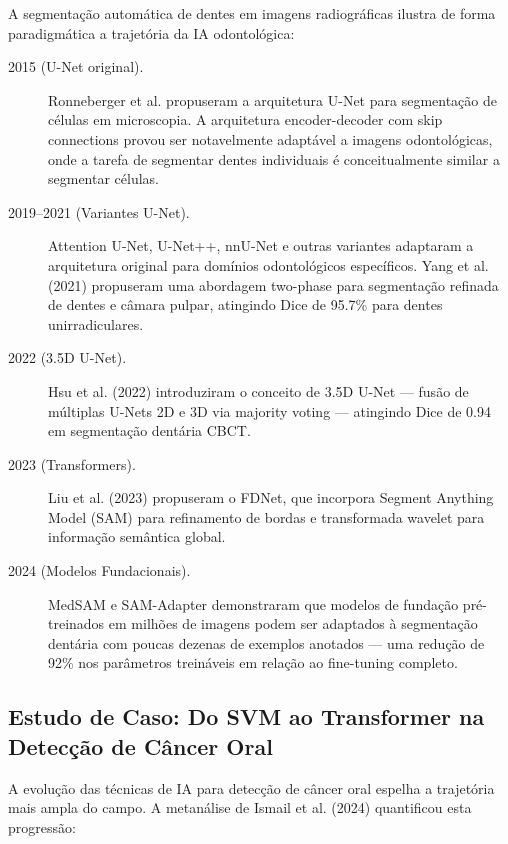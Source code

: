 A segmentação automática de dentes em imagens radiográficas ilustra de forma paradigmática a trajetória da IA odontológica:

\begin{description}
    \item[2015 (U-Net original).] Ronneberger et al. propuseram a arquitetura U-Net para segmentação de células em microscopia. A arquitetura encoder-decoder com skip connections provou ser notavelmente adaptável a imagens odontológicas, onde a tarefa de segmentar dentes individuais é conceitualmente similar a segmentar células.
    \item[2019--2021 (Variantes U-Net).] Attention U-Net, U-Net++, nnU-Net e outras variantes adaptaram a arquitetura original para domínios odontológicos específicos. Yang et al. (2021) \cite{ODT-035} propuseram uma abordagem two-phase para segmentação refinada de dentes e câmara pulpar, atingindo Dice de 95.7\% para dentes unirradiculares.
    \item[2022 (3.5D U-Net).] Hsu et al. (2022) \cite{ODT-032} introduziram o conceito de 3.5D U-Net — fusão de múltiplas U-Nets 2D e 3D via majority voting — atingindo Dice de 0.94 em segmentação dentária CBCT.
    \item[2023 (Transformers).] Liu et al. (2023) \cite{ODT-033} propuseram o FDNet, que incorpora Segment Anything Model (SAM) para refinamento de bordas e transformada wavelet para informação semântica global.
    \item[2024 (Modelos Fundacionais).] MedSAM \cite{DL-ODT-019} e SAM-Adapter \cite{DL-ODT-017} demonstraram que modelos de fundação pré-treinados em milhões de imagens podem ser adaptados à segmentação dentária com poucas dezenas de exemplos anotados — uma redução de 92\% nos parâmetros treináveis em relação ao fine-tuning completo.
\end{description}

\subsection{Estudo de Caso: Do SVM ao Transformer na Detecção de Câncer Oral}

A evolução das técnicas de IA para detecção de câncer oral espelha a trajetória mais ampla do campo. A metanálise de Ismail et al. (2024) \cite{ODT-023} quantificou esta progressão:

